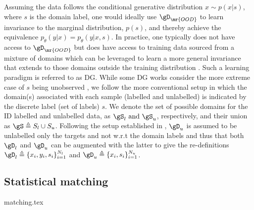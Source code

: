 Assuming the data follows the conditional generative distribution \( x \sim p(x | s) \), where
\(s\) is the domain label, one would ideally use \( \gD_{\mr{OOD}} \) to learn invariance to the
marginal distribution, \( p(s) \), and thereby achieve the equivalence \( p_\theta(y | x) =
p_\theta(y | x,
s) \).
%
In practice, one typically does not have access to \( \gD_{\mr{OOD}} \) but does have access to
training data sourced from a mixture of domains which can be leveraged to learn a more general
invariance that extends to those domains outside the training distribution
\citep{arjovsky2019invariant}.
%
Such a learning paradigm is referred to as \acf{DG}.
%
While some \ac{DG} works consider the more extreme case of $s$ being unobserved
\citep{creager2021environment}, we follow the more conventional setup \citep{arjovsky2019invariant,
krueger2021out, SagWeiLeeGaoetal22} in which the domain(s) associated with each sample (labelled
and unlabelled) is indicated by the discrete label (set of labels) $s$. 
%
We denote the set of possible domains for the \ac{ID} labelled and unlabelled data, as \( \gS_l$
and $\gS_u \), respectively, and their union as \( \gS \triangleq S_l \cup S_u \).
%
Following the setup established in \citet{SagWeiLeeGaoetal22}, \( \gD_u \) is assumed to be
unlabelled only \wrt{} the targets and not w.r.t the domain labels and thus that both \( \gD_l \)
and \( \gD_u \) can be augmented with the latter to give the re-definitions \( \gD_l \triangleq \{
  x_i, y_i, s_i \}_{i=1}^{N_l} \) and \( \gD_u \triangleq \{x_i, s_i \}_{i=1}^{N_u} \).

\subsection{Statistical matching} 
{matching.tex}
